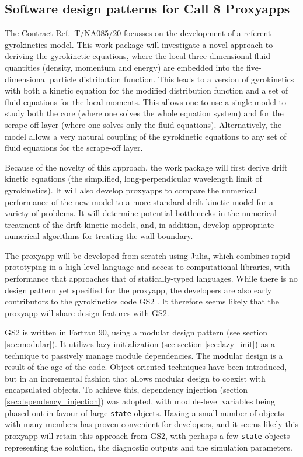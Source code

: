 \subsection{Software design patterns for Call 8 Proxyapps}\label{sec:call8}


The Contract Ref.\ T/NA085/20 focusses on the development of a referent
gyrokinetics model.
This work package will investigate a novel approach to deriving the gyrokinetic
equations, where the local three-dimensional fluid quantities (density,
momentum and energy) are embedded into the five-dimensional particle
distribution function.
This leads to a version of gyrokinetics with both a kinetic equation for the
modified distribution function and a set of fluid equations for the local
moments.
This allows one to use a single model to study both the core (where one solves
the whole equation system) and for the scrape-off layer (where one solves 
only the fluid equations).
Alternatively, the model allows a very natural coupling of the gyrokinetic
equations to any set of fluid equations for the scrape-off layer.

Because of the novelty of this approach, the work package will first derive
drift kinetic equations (the simplified, long-perpendicular wavelength
limit of gyrokinetics).
It will also develop proxyapps to compare the numerical performance of the new
model to a more standard drift kinetic model for a variety of problems.
It will determine potential bottlenecks in the numerical treatment of the drift
kinetic models, and, in addition, develop appropriate numerical algorithms for
treating the wall boundary.


The proxyapp will be developed from scratch using Julia, which combines rapid
prototyping in a high-level language and access to computational libraries,
with performance that approaches that of statically-typed languages. 
While there is no design pattern yet specified for the proxyapp, the developers
are also early contributors to the gyrokinetics code GS2 \cite{GS2}.
It therefore seems likely that the proxyapp will share design features with
GS2.

GS2 is written in Fortran 90, using a modular design pattern (see section
\ref{sec:modular}).
It utilizes lazy initialization (see section \ref{sec:lazy_init}) as a
technique to passively manage module dependencies.
The modular design is a result of the age of the code.
Object-oriented techniques have been introduced, but in an incremental
fashion that allows modular design to coexist with encapsulated objects.
To achieve this, dependency injection (section \ref{sec:dependency_injection})
was adopted, with module-level variables being phased out in favour of large
\texttt{state} objects.
Having a small number of objects with many members has proven convenient for developers,
and it seems likely this proxyapp will retain this approach from GS2,
with perhaps a few \texttt{state} objects representing the solution, the diagnostic outputs
and the simulation parameters.

